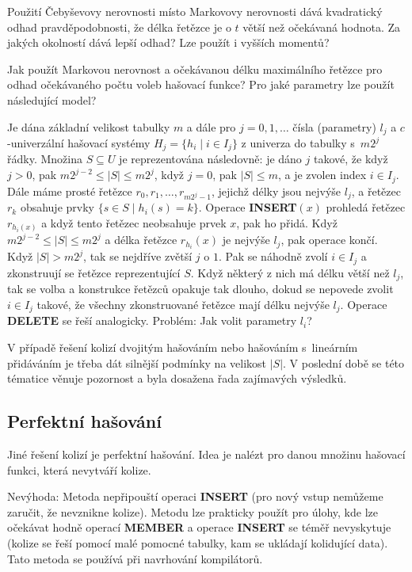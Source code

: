 \documentclass[a4paper,12pt]{article}
\begin{document}
Použití Čebyševovy nerovnosti místo 
Markovovy nerovnosti dává kvadratický odhad 
prav\-dě\-podobnosti, že délka řetězce je o $t$ větší než 
očekávaná hodnota. Za jakých okolností dává lepší 
odhad? Lze použít i vyšších momentů?

Jak použít Markovou nerovnost a očekávanou 
délku maximál\-ní\-ho řetězce pro odhad očeká\-va\-ného 
počtu voleb hašovací funk\-ce? 
Pro jaké parametry lze použít následující model?

Je dána základní velikost tabulky $m$ a dále pro $
j=0,1,\dots$ 
čísla (parametry) $l_j$ a $c$-univer\-zál\-ní hašovací systémy 
$H_j=\{h_i\mid i\in I_j\}$ z univerza do tabulky s~$m2^j$ řádky.\newline 
Množina $S\subseteq U$ je reprezentována následovně:  je dáno $
j$ 
tako\-vé, že když $j>0$, pak $m2^{j-2}\le |S|\le m2^j$, když $
j=0$, pak 
$|S|\le m$, a je zvolen index $i\in I_j$.  Dále máme prosté řetězce 
$r_0,r_1,\dots,r_{m2^j-1}$, jejichž délky jsou nejvýše $
l_j$, a řetězec $r_k$ 
obsahuje prvky $\{s\in S\mid h_i(s)=k\}$.\newline 
Operace {\bf INSERT$(x)$} prohledá řetězec $r_{h_i(x)}$ a když tento 
ře\-tě\-zec neobsahuje prvek $x$, pak ho přidá.  Když 
$m2^{j-2}\le |S|\le m2^j$ a délka řetězce $r_{h_i}(x)$ je nejvýše $
l_j$, pak 
operace končí.  Když $|S|>m2^j$, tak se nejdříve zvětší $
j$ o $1$.  
Pak se náhodně zvolí $i\in I_j$ a zkonstruují se řetězce 
reprezentující $S$.  Když některý z nich má délku větší než $
l_j$, 
tak se volba a konstrukce řetězců opakuje tak dlouho, 
dokud se nepovede zvolit $i\in I_j$ takové, že všechny 
zkonstruované řetězce mají délku nejvýše $l_j$.  Operace {\bf DELETE }
se řeší analogicky.\newline 
Problém:  Jak volit parametry $l_i$?  

V případě řešení 
kolizí dvojitým hašováním nebo hašováním s~lineárním přidáváním je třeba dát silnější podmínky na velikost $
|S|$. V poslední době se této tématice 
věnuje pozornost a byla dosažena řada zajímavých výsledků.

\subsection{Perfektní hašování}

Jiné řešení kolizí je perfektní hašování. Idea 
je nalézt pro danou množinu hašovací funkci, která 
nevytváří kolize.

Nevýhoda: Metoda nepřipouští operaci {\bf INSERT }
(pro nový vstup nemůžeme zaručit, že nevznikne  
kolize). Metodu lze prakticky použít pro úlohy, kde lze 
očekávat hodně operací {\bf MEMBER} a operace {\bf INSERT} se 
téměř nevyskytuje (kolize se řeší pomocí malé pomocné 
tabulky, kam se ukládají kolidují\-cí data). Tato metoda se 
používá při navrhování kompilátorů.
\end{document}
